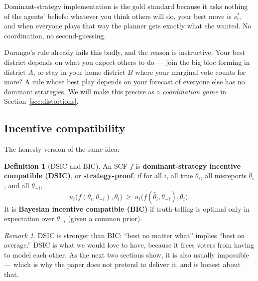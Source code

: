 \documentclass[11pt,letterpaper]{article}
\theoremstyle{definition}
\newtheorem{definition}{Definition}[section]
\theoremstyle{plain}
\theoremstyle{remark}
\newtheorem*{remark}{Remark}
\newcommand{\type}{\theta}
\newcommand{\scf}{f}
\begin{document}
\begin{intuition}
Dominant-strategy implementation is the gold standard because it asks nothing of the agents'
beliefs: whatever you think others will do, your best move is $s_i^*$, and when everyone plays
that way the planner gets exactly what she wanted. No coordination, no second-guessing.
\end{intuition}

\begin{connection}
Durango's rule already fails this badly, and the reason is instructive. Your best district
depends on what you expect others to do --- join the big bloc forming in district $A$, or stay in
your home district $B$ where your marginal vote counts for more? A rule whose best play depends
on your forecast of everyone else has no dominant strategies. We will make this precise as a
\emph{coordination game} in Section~\ref{sec:distortions}.
\end{connection}

\subsection{Incentive compatibility}

The honesty version of the same idea:

\begin{definition}[DSIC and BIC]
\label{def:ic}
An SCF $\scf$ is \textbf{dominant-strategy incentive compatible (DSIC)}, or
\textbf{strategy-proof}, if for all $i$, all true $\type_i$, all misreports $\hat\type_i$, and
all $\type_{-i}$,
\[
  u_i\bigl(\scf(\type_i,\type_{-i}),\type_i\bigr)\ \ge\ u_i\bigl(\scf(\hat\type_i,\type_{-i}),\type_i\bigr).
\]
It is \textbf{Bayesian incentive compatible (BIC)} if truth-telling is optimal only in
expectation over $\type_{-i}$ (given a common prior).
\end{definition}

\begin{remark}
DSIC is stronger than BIC: ``best no matter what'' implies ``best on average.'' DSIC is what we
would love to have, because it frees voters from having to model each other. As the next two
sections show, it is also usually impossible --- which is why the paper does not pretend to
deliver it, and is honest about that.
\end{remark}

\end{document}
